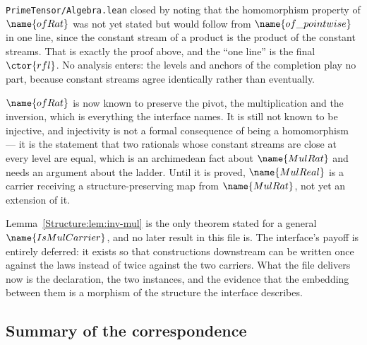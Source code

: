 \begin{remark}\label{Structure:rem:predicted}
\texttt{PrimeTensor/Algebra.lean} closed by noting that the homomorphism
property of $\name{ofRat}$ was not yet stated but would follow from
$\name{of\_pointwise}$ in one line, since the constant stream of a product is
the product of the constant streams.  That is exactly the proof above, and the
``one line'' is the final $\ctor{rfl}$.  No analysis enters: the levels and
anchors of the completion play no part, because constant streams agree
identically rather than eventually.
\end{remark}

\begin{remark}\label{Structure:rem:injective}
$\name{ofRat}$ is now known to preserve the pivot, the multiplication and the
inversion, which is everything the interface names.  It is still not known to
be injective, and injectivity is not a formal consequence of being a
homomorphism --- it is the statement that two rationals whose constant streams
are close at every level are equal, which is an archimedean fact about
$\name{MulRat}$ and needs an argument about the ladder.  Until it is proved,
$\name{MulReal}$ is a carrier receiving a structure-preserving map from
$\name{MulRat}$, not yet an extension of it.
\end{remark}

\begin{remark}\label{Structure:rem:unused}
Lemma~\ref{Structure:lem:inv-mul} is the only theorem stated for a general
$\name{IsMulCarrier}$, and no later result in this file is.  The interface's
payoff is entirely deferred: it exists so that constructions downstream can be
written once against the laws instead of twice against the two carriers.  What
the file delivers now is the declaration, the two instances, and the evidence
that the embedding between them is a morphism of the structure the interface
describes.
\end{remark}

\subsection*{Summary of the correspondence}

